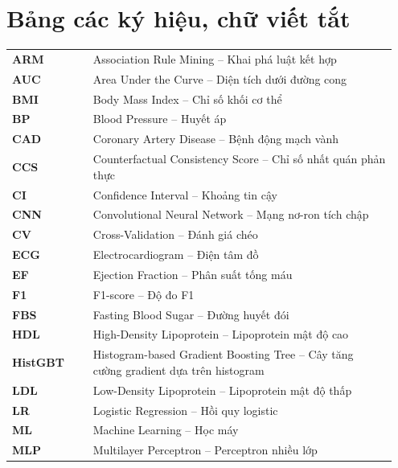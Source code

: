 
\makeatletter
\ifdim\pagetotal=0pt\else\clearpage\fi
\makeatother
{\let\clearpage\relax\let\cleardoublepage\relax
\chapter*{Bảng các ký hiệu, chữ viết tắt}}

\noindent\begin{tabular}{@{}p{0.20\linewidth} p{0.75\linewidth}@{}}
\textbf{ARM} & Association Rule Mining -- Khai phá luật kết hợp \\[4pt]
\textbf{AUC} & Area Under the Curve -- Diện tích dưới đường cong \\[4pt]
\textbf{BMI} & Body Mass Index -- Chỉ số khối cơ thể \\[4pt]
\textbf{BP} & Blood Pressure -- Huyết áp \\[4pt]
\textbf{CAD} & Coronary Artery Disease -- Bệnh động mạch vành \\[4pt]
\textbf{CCS} & Counterfactual Consistency Score -- Chỉ số nhất quán phản thực \\[4pt]
\textbf{CI} & Confidence Interval -- Khoảng tin cậy \\[4pt]
\textbf{CNN} & Convolutional Neural Network -- Mạng nơ-ron tích chập \\[4pt]
\textbf{CV} & Cross-Validation -- Đánh giá chéo \\[4pt]
\textbf{ECG} & Electrocardiogram -- Điện tâm đồ \\[4pt]
\textbf{EF} & Ejection Fraction -- Phân suất tống máu \\[4pt]
\textbf{F1} & F1-score -- Độ đo F1 \\[4pt]
\textbf{FBS} & Fasting Blood Sugar -- Đường huyết đói \\[4pt]
\textbf{HDL} & High-Density Lipoprotein -- Lipoprotein mật độ cao \\[4pt]
\textbf{HistGBT} & Histogram-based Gradient Boosting Tree -- Cây tăng cường gradient dựa trên histogram \\[4pt]
\textbf{LDL} & Low-Density Lipoprotein -- Lipoprotein mật độ thấp \\[4pt]
\textbf{LR} & Logistic Regression -- Hồi quy logistic \\[4pt]
\textbf{ML} & Machine Learning -- Học máy \\[4pt]
\textbf{MLP} & Multilayer Perceptron -- Perceptron nhiều lớp \\[4pt]

\end{tabular}
